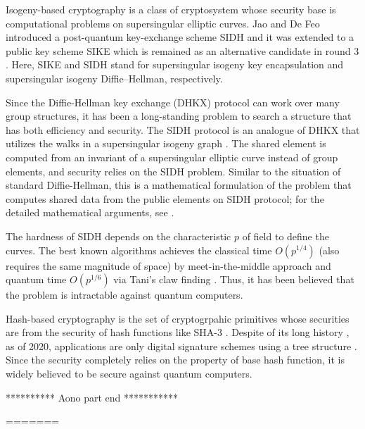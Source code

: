 Isogeny-based cryptography is a class of cryptosystem whose security base is computational problems on supersingular elliptic curves.
Jao and De Feo introduced a post-quantum key-exchange scheme SIDH \cite{JF11}
and it was extended to a public key scheme SIKE \cite{SIKEweb} which is remained as an alternative candidate in round 3 \cite{NISTpqround3}.
Here, SIKE and SIDH stand for supersingular isogeny key encapsulation
and supersingular isogeny Diffie–Hellman, respectively.

Since the Diffie-Hellman key exchange (DHKX) protocol can work over many group structures, it has been a long-standing problem to search a structure that has both efficiency and security.
The SIDH protocol is an analogue of DHKX that utilizes 
the walks in a supersingular isogeny graph \cite{JF11}.
The shared element is computed from an invariant of a supersingular elliptic curve instead of group elements,
and security relies on the SIDH problem.
Similar to the situation of standard Diffie-Hellman,
this is a mathematical formulation of the problem that computes 
shared data from the public elements on SIDH protocol;
for the detailed mathematical arguments, see \cite{Feo17,GV18}.

The hardness of SIDH depends on the characteristic $p$ of field to define the curves.
The best known algorithms achieves the classical time $O(p^{1/4})$ (also requires the same magnitude of space) by meet-in-the-middle approach \cite{GPST16,ACC+19} and quantum time $O(p^{1/6})$ via Tani's claw finding \cite{Tani09}.
Thus, it has been believed that the problem is intractable against quantum computers.

Hash-based cryptography is the set of cryptogrpahic primitives whose securities are from the security of hash functions like SHA-3 \cite{SHA3}.
Despite of its long history \cite{Lam79}, 
as of 2020, applications are only digital signature schemes using a tree structure \cite{BHH+15}.
Since the security completely relies on the property of base hash function, it is widely believed to be secure against quantum computers.

********** Aono part end ***********





=======


